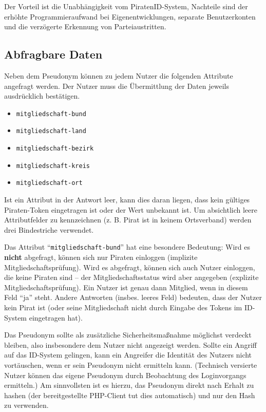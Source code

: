 Der Vorteil ist die Unabhängigkeit vom PiratenID-System, Nachteile sind der erhöhte Programmieraufwand bei Eigenentwicklungen,
separate Benutzerkonten und die verzögerte Erkennung von Parteiaustritten.

\subsection{Abfragbare Daten}
\label{sec:attribute}
Neben dem Pseudonym können zu jedem Nutzer die folgenden Attribute angefragt werden.
Der Nutzer muss die Übermittlung der Daten jeweils ausdrücklich bestätigen.

\begin{itemize}
	\item \texttt{mitgliedschaft-bund}
	\item \texttt{mitgliedschaft-land}
	\item \texttt{mitgliedschaft-bezirk}
	\item \texttt{mitgliedschaft-kreis}
	\item \texttt{mitgliedschaft-ort}
\end{itemize}

Ist ein Attribut in der Antwort leer, kann dies daran liegen, dass kein gültiges Piraten-Token eingetragen ist oder der Wert unbekannt ist.
Um absichtlich leere Attributfelder zu kennzeichnen (z. B. Pirat ist in keinem Ortsverband) werden drei Bindestriche verwendet.

Das Attribut "`\texttt{mitgliedschaft-bund}"' hat eine besondere Bedeutung:
Wird es \textbf{nicht} abgefragt, können sich nur Piraten einloggen (implizite Mitgliedschaftsprüfung).
Wird es abgefragt, können sich auch Nutzer einloggen, die keine Piraten sind -- der Mitgliedschaftsstatus wird aber angegeben (explizite Mitgliedschaftsprüfung).
Ein Nutzer ist genau dann Mitglied, wenn in diesem Feld "`ja"' steht.
Andere Antworten (insbes. leeres Feld) bedeuten, dass der Nutzer kein Pirat ist (oder seine Mitgliedschaft nicht durch Eingabe des Tokens im ID-System eingetragen hat).


Das Pseudonym sollte als zusätzliche Sicherheitsmaßnahme möglichst verdeckt bleiben, also insbesondere dem Nutzer nicht angezeigt werden.
Sollte ein Angriff auf das ID-System gelingen, kann ein Angreifer die Identität des Nutzers nicht vortäuschen, wenn er sein Pseudonym nicht ermitteln kann.
(Technisch versierte Nutzer können das eigene Pseudonym durch Beobachtung des Loginvorgangs ermitteln.)
Am sinnvollsten ist es hierzu, das Pseudonym direkt nach Erhalt zu hashen (der bereitgestellte PHP-Client tut dies automatisch) und nur den Hash zu verwenden.


